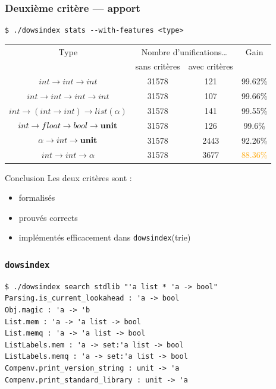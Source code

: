 \documentclass[serif]{beamer}
\newcommand{\dowsindex}{\texttt{dowsindex}\xspace}
\begin{document}
\begin{frame}[fragile=singleslide]\frametitle{Deuxième critère — apport}
\small
\begin{verbatim}
$ ./dowsindex stats --with-features <type>
\end{verbatim}
\begin{table}[h]
	\centering
	\begin{tabular}{|*{4}{c|}}
		\hline
			Type &
			\multicolumn{2}{c|}{Nombre d'unifications\dots} &
			Gain
		\\
		\cline{2-3}
			&
			sans critères & avec critères &
		\\
		\hline
			$int \rightarrow int \rightarrow int$ &
			31578 & 121 & 99.62\%
		\\
			$int \rightarrow int \rightarrow int \rightarrow int$ &
			31578 & 107 & 99.66\%
		\\
			$int \rightarrow (int \rightarrow int) \rightarrow list (\alpha)$ &
			31578 & 141 & 99.55\%
		\\
			$int \rightarrow float \rightarrow bool \rightarrow \bold{unit}$ &
			31578 & 126 & 99.6\%
		\\
			$\alpha \rightarrow int \rightarrow \bold{unit}$ &
			31578 & 2443 & 92.26\%
		\\
			$int \rightarrow int \rightarrow \alpha$ &
			31578 & 3677 & \textcolor{orange}{88.36\%}
		\\
		\hline
	\end{tabular}
\end{table}
\end{frame}


\begin{frame}{Conclusion}
Les deux critères sont :
\begin{itemize}
	\item formalisés
	\item prouvés corrects
	\item implémentés efficacement dans \dowsindex (trie)
\end{itemize}
\end{frame}


\begin{frame}[fragile=singleslide]\frametitle{\dowsindex}
\small
\begin{verbatim}
$ ./dowsindex search stdlib "'a list * 'a -> bool"
Parsing.is_current_lookahead : 'a -> bool
Obj.magic : 'a -> 'b
List.mem : 'a -> 'a list -> bool
List.memq : 'a -> 'a list -> bool
ListLabels.mem : 'a -> set:'a list -> bool
ListLabels.memq : 'a -> set:'a list -> bool
Compenv.print_version_string : unit -> 'a
Compenv.print_standard_library : unit -> 'a
\end{verbatim}
\end{frame}
\end{document}
